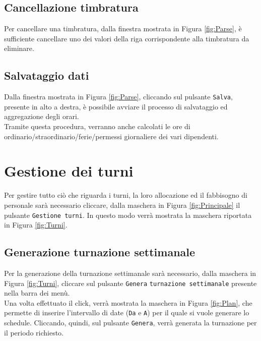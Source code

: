 \subsection{Cancellazione timbratura}
Per cancellare una timbratura, dalla finestra mostrata in Figura \ref{fig:Parse}, è sufficiente cancellare uno dei valori della riga corrispondente alla timbratura da eliminare.
\subsection{Salvataggio dati}
Dalla finestra mostrata in Figura \ref{fig:Parse}, cliccando sul pulsante \verb|Salva|, presente in alto a destra, è possibile avviare il processo di salvataggio ed aggregazione degli orari.\\
Tramite questa procedura, verranno anche calcolati le ore di ordinario/straordinario/ferie/permessi giornaliere dei vari dipendenti.
\section{Gestione dei turni}
Per gestire tutto ciò che riguarda i turni, la loro allocazione ed il fabbisogno di personale sarà necessario cliccare, dalla maschera in Figura \ref{fig:Principale} il pulsante \verb|Gestione turni|. In questo modo verrà mostrata la maschera riportata in Figura \ref{fig:Turni}.
\subsection{Generazione turnazione settimanale}
Per la generazione della turnazione settimanale sarà necessario, dalla maschera in Figura \ref{fig:Turni}, cliccare sul pulsante \verb|Genera| \verb|turnazione settimanale| presente nella barra dei menù.\\

\noindent
Una volta effettuato il click, verrà mostrata la maschera in Figura \ref{fig:Plan}, che permette di inserire l'intervallo di date (\verb|Da| e \verb|A|) per il quale si vuole generare lo schedule.
\noindent
Cliccando, quindi, sul pulsante \verb|Genera|, verrà generata la turnazione per il periodo richiesto.\\

